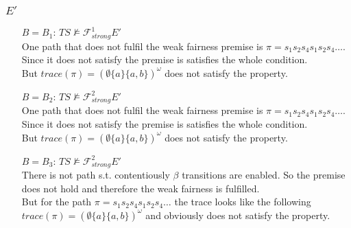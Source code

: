 \documentclass[11pt]{article}
\begin{document}
\subsubsection{$E'$}
\begin{itemize}
	\item[$B=B_1$:] $TS \not\models{\mathcal{F}_{strong}^1} E'$\\
		One path that does not fulfil the weak fairness premise is $\pi=s_1s_2s_4s_1s_2s_4\dots$. Since it does not satisfy the premise is satisfies the whole condition.\\
		But $trace(\pi) = (\emptyset\{a\}\{a,b\})^\omega$ does not satisfy the property.
	\item[$B=B_2$:] $TS \not\models{\mathcal{F}_{strong}^2} E'$\\
		One path that does not fulfil the weak fairness premise is $\pi=s_1s_2s_4s_1s_2s_4\dots$. Since it does not satisfy the premise is satisfies the whole condition.\\
		But $trace(\pi) = (\emptyset\{a\}\{a,b\})^\omega$ does not satisfy the property.
	\item[$B=B_3$:] $TS \not\models{\mathcal{F}_{strong}^2} E'$\\
		There is not path s.t. contentiously $\beta$ transitions are enabled. So the premise does not hold and therefore the weak fairness is fulfilled.\\
		But for the path $\pi=s_1s_2s_4s_1s_2s_4\dots$ the trace looks like the following $trace(\pi)= (\emptyset\{a\}\{a,b\})^\omega$ and obviously does not satisfy the property.
\end{itemize}
\end{document}

